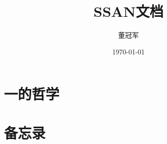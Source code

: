 \documentclass[UTF8,oneside]{ctexbook}
\title{SSAN文档}
\author{董冠军}
\date{\today}
\begin{document}
\maketitle
\tableofcontents

\listoftodos[Notes]


%
%
%


%
%
%

\part{一的哲学}




\part{备忘录}







% 
% 

% 
% 
% 
%  
% 
% 
% 

% 
% 
% 
% 

% 
% 
% 

% 
% 
% 

% 
% 

% 
\end{document}
